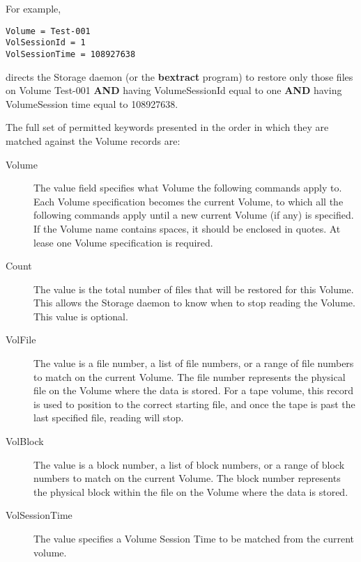 For example,

\footnotesize
\begin{verbatim}
Volume = Test-001
VolSessionId = 1
VolSessionTime = 108927638
\end{verbatim}
\normalsize

directs the Storage daemon (or the {\bf bextract} program) to restore only
those files on Volume Test-001 {\bf AND} having VolumeSessionId equal to one
{\bf AND} having VolumeSession time equal to 108927638.

The full set of permitted keywords presented in the order in which they are
matched against the Volume records are:

\begin{description}

\item [Volume]
   The value field specifies what Volume the following commands apply to.
   Each Volume specification becomes the current Volume, to which all the
   following commands apply until a new current Volume (if any) is
   specified.  If the Volume name contains spaces, it should be enclosed in
   quotes. At lease one Volume specification is required.

\item [Count]
   The value is the total number of files that  will be restored for this Volume.
   This allows the Storage  daemon to know when to stop reading the Volume.
   This value is optional.

\item [VolFile]
   The value is a file number, a list of file numbers, or a range of file
   numbers to match on the current Volume.  The file number represents the
   physical file on the Volume where the data is stored.  For a tape
   volume, this record is used to position to the correct starting file,
   and once the tape is past the last specified file, reading will stop.

\item [VolBlock]
   The value is a block number, a list of block numbers, or a range of
   block numbers to match on the current Volume.  The block number
   represents the physical block within the file on the Volume where the
   data is stored.


\item [VolSessionTime]
   The value specifies a Volume Session Time to  be matched from the current
   volume.


\end{description}
